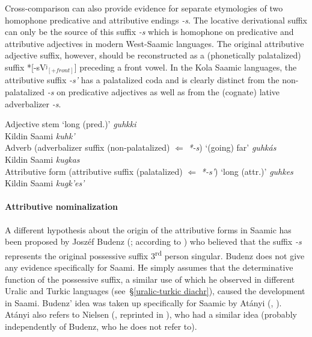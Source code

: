 {Cross-comparison can also provide evidence for separate etymologies of two homophone predicative and attributive endings \textit{-s}. The locative derivational suffix can only be the source of this suffix \textit{-s} which is homophone on predicative and attributive adjectives in modern West-Saamic languages. The original attributive adjective suffix, however, should be reconstructed as a (phonetically palatalized) suffix *[-sVʲ$_{[+front]}$] preceding a front vowel. In the Kola Saamic languages, the attributive suffix \textit{-s'} has a palatalized coda and is clearly distinct from the non-palatalized \textit{-s} on predicative adjectives as well as from the (cognate) lative adverbalizer \textit{-s}.
\begin{exe}
\ex 
\begin{xlist}
\ex	Adjective stem ‘long (pred.)’
 \textit{guhkki}\\
	{Kildin Saami} \textit{kuhk'}\\
\ex 	Adverb (adverbalizer suffix (non-palatalized) $\Leftarrow$ \textit{*-s}) ‘(going) far’
 \textit{guhkás}\\
	{Kildin Saami} \textit{kugkas}\\
\ex 	Attributive form (attributive suffix (palatalized) $\Leftarrow$ \textit{*-s'}) ‘long (attr.)’
 \textit{guhkes}\\
	{Kildin Saami} \textit{kugk'es'}\\
\end{xlist} 	
\end{exe}

\paragraph{Attributive nominalization}
A different hypothesis about the origin of the attributive forms in Saamic has been proposed by Joszéf Budenz (\citeyear{budenz1870}; according to \citealt{atanyi1942,atanyi1943}) who believed that the suffix \textit{-s} represents the original possessive suffix 3\textsuperscript{rd} person singular. Budenz does not give any evidence specifically for Saami. He simply assumes that the determinative function of the possessive suffix, a similar use of which he observed in different Uralic and Turkic languages (see~\S\ref{uralic-turkic diachr}), caused the development in Saami. Budenz' idea was taken up specifically for Saamic by Atányi (\citeyear{atanyi1942}, \citeyear{atanyi1943}). Atányi also refers to Nielsen (\citeyear{nielsen1933}, reprinted in \citealt{nielsen1945b}), who had a similar idea (probably independently of Budenz, who he does not refer to).

}

